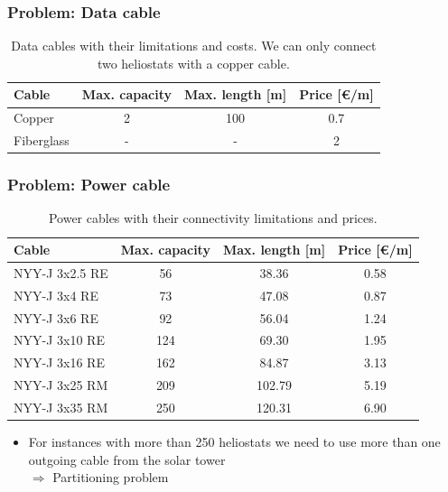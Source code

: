 \begin{frame}\frametitle{Problem: Data cable}
\begin{table}
  \caption{Data cables with their limitations and costs. We can only connect two heliostats with a copper cable.}
  \begin{tabular}{l|cc|c}
    Cable & Max. capacity & Max. length [m] & Price [\euro/m] \\
    \toprule
    Copper & 2 & 100 & 0.7 \\
    Fiberglass & - & - & 2
  \end{tabular}
\end{table}
\end{frame}

\begin{frame}\frametitle{Problem: Power cable}
\begin{table}
  \caption{Power cables with their connectivity limitations and prices.}
  \begin{tabular}{l|cc|c}
    Cable & Max. capacity & Max. length [m] & Price [\euro/m] \\
    \toprule
    NYY-J 3x2.5 RE & 56 & 38.36 & 0.58 \\
    NYY-J 3x4 RE & 73 & 47.08 & 0.87 \\
    NYY-J 3x6 RE & 92 & 56.04 & 1.24 \\
    NYY-J 3x10 RE & 124 & 69.30 & 1.95 \\
    NYY-J 3x16 RE & 162 & 84.87 & 3.13 \\
    \midrule
    NYY-J 3x25 RM & 209 & 102.79 & 5.19 \\
    NYY-J 3x35 RM & 250 & 120.31 & 6.90
  \end{tabular}
\end{table}
\begin{itemize}
  \item For instances with more than 250 heliostats we need to use more than one outgoing cable from the solar tower \\ $\Rightarrow$ Partitioning problem
\end{itemize}
\end{frame}

